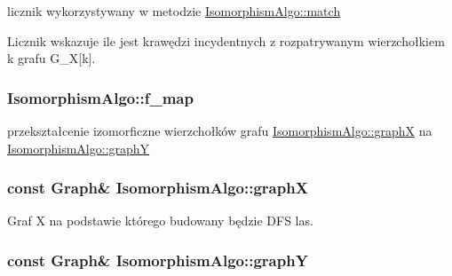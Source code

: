 licznik wykorzystywany w metodzie \hyperlink{classIsomorphismAlgo_aa10814d9f3fe70fde74ec4f6aadb6273}{Isomorphism\-Algo\-::match} 

Licznik wskazuje ile jest krawędzi incydentnych z rozpatrywanym wierzchołkiem k grafu G\-\_\-\-X\mbox{[}k\mbox{]}. \hypertarget{classIsomorphismAlgo_a75072a3ecb3b6ed97207b016a83b8571}{
\subsubsection[{f\-\_\-map}]{ Isomorphism\-Algo\-::f\-\_\-map\hspace{0.3cm}{\ttfamily [private]}}}\label{classIsomorphismAlgo_a75072a3ecb3b6ed97207b016a83b8571}


przekształcenie izomorficzne wierzchołków grafu \hyperlink{classIsomorphismAlgo_a78bc7264b0a6a264b0343209b3ca3647}{Isomorphism\-Algo\-::graph\-X} na \hyperlink{classIsomorphismAlgo_a7656ae201d816e62edda60462cdb3a6e}{Isomorphism\-Algo\-::graph\-Y} 

\hypertarget{classIsomorphismAlgo_a78bc7264b0a6a264b0343209b3ca3647}{
\subsubsection[{graph\-X}]{\setlength{\rightskip}{0pt plus 5cm}const {\bf Graph}\& Isomorphism\-Algo\-::graph\-X\hspace{0.3cm}{\ttfamily [private]}}}\label{classIsomorphismAlgo_a78bc7264b0a6a264b0343209b3ca3647}


Graf X na podstawie którego budowany będzie D\-F\-S las. 

\hypertarget{classIsomorphismAlgo_a7656ae201d816e62edda60462cdb3a6e}{
\subsubsection[{graph\-Y}]{\setlength{\rightskip}{0pt plus 5cm}const {\bf Graph}\& Isomorphism\-Algo\-::graph\-Y\hspace{0.3cm}{\ttfamily [private]}}}\label{classIsomorphismAlgo_a7656ae201d816e62edda60462cdb3a6e}


